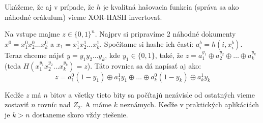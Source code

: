 Ukážeme, že aj v prípade, že $h$ je kvalitná hašovacia funkcia
(správa sa ako náhodné orákulum) vieme XOR-HASH invertovať.

Na vstupe majme $z \in \{0,1\}^n$. Najprv si pripravíme
2 náhodné dokumenty $x^0 = x_1^0 x_2^0 \dots x_k^0$ a 
$x_1 = x_1^1 x_2^1 \dots x_k^1$. Spočítame si hashe ich častí:
$a_i^b = h(i, x_i^b)$. 
Teraz chceme nájsť $y = y_1 y_2 \dots y_k$, kde $y_1 \in \{0,1\}$,
také, že $z = a_1^{y_1} \oplus a_2^{y_2} \oplus \dots \oplus a_k^{y_k}$
(teda $H(x_1^{y_1} x_2^{y_2} \dots x_k^{y_k}) = z$).
Táto rovnica sa dá napísať aj ako:
$$z = a_1^0 (1 - y_1) \oplus a_1^1 y_1 \oplus \dots \oplus a_k^0 (1 - y_k) \oplus a_k^1 y_k$$

Keďže $z$ má $n$ bitov a všetky tieto bity sa počítajú nezávisle od ostatných vieme
zostaviť $n$ rovníc nad $Z_2$. A máme $k$ neznámych. Keďže v praktických
aplikáciách je $k > n$ dostaneme skoro vždy riešenie.



